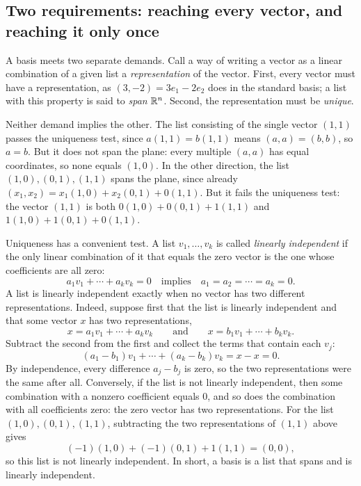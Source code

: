 \subsection*{Two requirements: reaching every vector, and reaching it only once}
A basis meets two separate demands. Call a way of writing a vector as a linear combination of a given list a \emph{representation} of the vector. First, every vector must have a representation, as $(3,-2)=3e_1-2e_2$ does in the standard basis; a list with this property is said to \emph{span} $\mathbb R^n$. Second, the representation must be \emph{unique}.

Neither demand implies the other. The list consisting of the single vector $(1,1)$ passes the uniqueness test, since $a(1,1)=b(1,1)$ means $(a,a)=(b,b)$, so $a=b$. But it does not span the plane: every multiple $(a,a)$ has equal coordinates, so none equals $(1,0)$. In the other direction, the list $(1,0),(0,1),(1,1)$ spans the plane, since already $(x_1,x_2)=x_1(1,0)+x_2(0,1)+0(1,1)$. But it fails the uniqueness test: the vector $(1,1)$ is both $0(1,0)+0(0,1)+1(1,1)$ and $1(1,0)+1(0,1)+0(1,1)$.

Uniqueness has a convenient test. A list $v_1,\ldots,v_k$ is called \emph{linearly independent} if the only linear combination of it that equals the zero vector is the one whose coefficients are all zero:
\[
a_1v_1+\cdots+a_kv_k=0\quad\text{implies}\quad a_1=a_2=\cdots=a_k=0.
\]
A list is linearly independent exactly when no vector has two different representations. Indeed, suppose first that the list is linearly independent and that some vector $x$ has two representations,
\[
x=a_1v_1+\cdots+a_kv_k\qquad\text{and}\qquad x=b_1v_1+\cdots+b_kv_k.
\]
Subtract the second from the first and collect the terms that contain each $v_j$:
\[
(a_1-b_1)v_1+\cdots+(a_k-b_k)v_k=x-x=0.
\]
By independence, every difference $a_j-b_j$ is zero, so the two representations were the same after all. Conversely, if the list is not linearly independent, then some combination with a nonzero coefficient equals $0$, and so does the combination with all coefficients zero: the zero vector has two representations. For the list $(1,0),(0,1),(1,1)$, subtracting the two representations of $(1,1)$ above gives
\[
(-1)(1,0)+(-1)(0,1)+1(1,1)=(0,0),
\]
so this list is not linearly independent. In short, a basis is a list that spans and is linearly independent.


